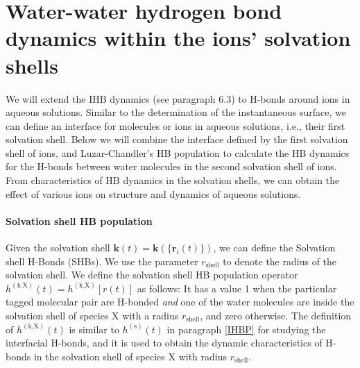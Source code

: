 \FloatBarrier
\section{Water-water hydrogen bond dynamics within the ions' solvation shells} \label{PARA_SHBD}
We will extend the IHB dynamics (see paragraph 6.3) to H-bonds around ions in aqueous solutions. 
Similar to the determination of the instantaneous surface, we can define an interface for molecules or ions in aqueous solutions, i.e., 
their first solvation shell. 
Below we will combine the interface defined by the first solvation shell of ions, 
and Luzar-Chandler's HB population \cite{AL96} to calculate the HB
dynamics for the H-bonds between water molecules in the second solvation shell of ions.
From characteristics of HB dynamics in the solvation shells, we can obtain the effect of various ions on structure and dynamics of aqueous solutions. 

\paragraph{Solvation shell HB population}\label{para:SHBP}
Given the solvation shell ${\mathbf k}(t)={\mathbf k}(\{{\mathbf r}_i(t)\})$, we can define the Solvation shell H-Bonds (SHBs).
We use the parameter $r_\text{shell}$ to denote the radius of the solvation shell.
We define the solvation shell HB population operator $h^{(\text{k,X})}(t) = h^{(\text{k,X})}[{r}(t)]$ as follows:
It has a value 1 when the particular tagged molecular pair are H-bonded \emph{and} one of the water molecules are inside the solvation shell of species X
with a radius $r_\text{shell}$, and zero otherwise. 
The definition of $h^{(\text{k,X})}(t)$ is similar to $h^{(\text{s})}(t)$ in paragraph \ref{IHBP} for studying the interfacial H-bonds, and it is used to obtain the dynamic characteristics of H-bonds in the solvation shell of species X with radius $r_\text{shell}$. 

